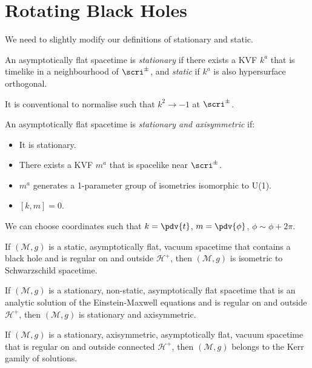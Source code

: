 \documentclass{jknotes}
\begin{document}
\section{Rotating Black Holes}
We need to slightly modify our definitions of stationary and static.
\begin{defn}
    An asymptotically flat spacetime is \emph{stationary} if there exists a KVF \(k^a\) that is timelike in a neighbourhood of \(\scri^\pm\), and \emph{static} if \(k^a\) is also hypersurface orthogonal.
\end{defn}
It is conventional to normalise such that \(k^2\to-1\) at \(\scri^\pm\).
\begin{defn}
    An asymptotically flat spacetime is \emph{stationary and axisymmetric} if:
    \begin{itemize}
        \item It is stationary.
        \item There exists a KVF \(m^a\) that is spacelike near \(\scri^\pm\).
        \item \(m^a\) generates a 1-parameter group of isometries isomorphic to U(1).
        \item \([k,m]=0\).
    \end{itemize}
\end{defn}
We can choose coordinates such that \(k=\pdv{t}\), \(m=\pdv{\phi}\), \(\phi \sim \phi+2\pi\).
\begin{theorem}
    If \((\mathcal{M},g)\) is a static, asymptotically flat, vacuum spacetime that contains a black hole and is regular on and outside \(\mathcal{H}^+\), then \((\mathcal{M},g)\) is isometric to Schwarzschild spacetime.
\end{theorem}
\begin{theorem}
    If \((\mathcal{M},g)\) is a stationary, non-static, asymptotically flat spacetime that is an analytic solution of the Einstein-Maxwell equations and is regular on and outside \(\mathcal{H}^+\), then \((\mathcal{M},g)\) is stationary and axisymmetric.
\end{theorem}
\begin{theorem}
    If \((\mathcal{M},g)\) is a stationary, axisymmetric, asymptotically flat, vacuum spacetime that is regular on and outside connected \(\mathcal{H}^+\), then \((\mathcal{M},g)\) belongs to the Kerr gamily of solutions.
\end{theorem}
\end{document}
